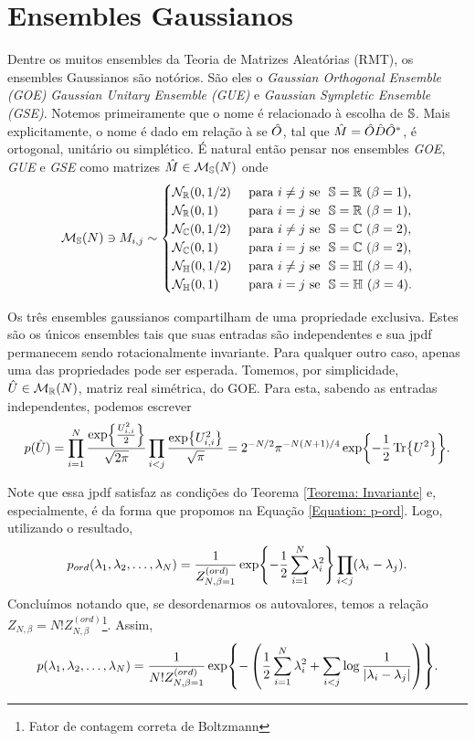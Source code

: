 \section{Ensembles Gaussianos}

Dentre os muitos ensembles da Teoria de Matrizes Aleatórias (RMT), os ensembles Gaussianos são notórios. São eles o \textit{Gaussian Orthogonal Ensemble (GOE)} \textit{Gaussian Unitary Ensemble (GUE)} e \textit{Gaussian Sympletic Ensemble (GSE)}. Notemos primeiramente que o nome é relacionado à escolha de $\mathbb{S}$. Mais explicitamente, o nome é dado em relação à se $\hat O$, tal que $\hat M = \hat O\hat D\hat O^*$, é ortogonal, unitário ou simplético. É natural então pensar nos ensembles \textit{GOE}, \textit{GUE} e \textit{GSE} como matrizes $\hat M \in \mathcal{M}_{\mathbb{S}}(N)$ onde 
$$ 
\mathcal{M}_{\Se}(N) \ni M_{i,j} \sim
\begin{cases}
	\mathcal{N}_{\R}(0,1/2) &  \ \text{para} \ i \neq j \ \text{se} \ \ \Se = \R \ (\beta = 1),\\
	\mathcal{N}_{\R}(0,1) & \ \text{para} \ i = j \ \text{se} \ \ \Se = \R \ (\beta = 1),\\
	\mathcal{N}_{\C}(0,1/2)  & \ \text{para} \ i \neq j \ \text{se} \ \ \Se = \C \ (\beta = 2),\\
	\mathcal{N}_{\C}(0,1) & \ \text{para} \ i = j \ \text{se} \ \ \Se = \C \ (\beta = 2),\\
	\mathcal{N}_{\He}(0,1/2) & \ \text{para} \ i \neq j \ \text{se} \ \ \Se = \He \ (\beta = 4), \\
	\mathcal{N}_{\He}(0,1) & \ \text{para} \ i = j \ \text{se} \ \ \Se = \He \ (\beta = 4).
\end{cases} $$


Os três ensembles gaussianos compartilham de uma propriedade exclusiva. Estes são os únicos ensembles tais que suas entradas são independentes e sua jpdf permanecem sendo rotacionalmente invariante. Para qualquer outro caso, apenas uma das propriedades pode ser esperada. Tomemos, por simplicidade, $\hat U \in \mathcal{M}_{\mathbb{R}}(N)$, matriz real simétrica, do GOE. Para esta, sabendo as entradas independentes, podemos escrever $$p(\hat U) = \prod_{i=1}^{N}\frac{\exp{\frac{U_{i,i}^2}{2}}}{\sqrt{2\pi}} \prod_{i<j} \frac{\exp{U_{i,i}^2}}{\sqrt{\pi}} = 2^{-N/2} \pi^{-N(N + 1)/4} \exp{-\frac{1}{2} \Tr{U^2}}.$$

Note que essa jpdf satisfaz as condições do Teorema \ref{Teorema: Invariante} e, especialmente, é da forma que propomos na Equação \ref{Equation: p-ord}. Logo, utilizando o resultado, $$ p_{ord}(\lambda_1, \lambda_2, \dots, \lambda_N) = \frac{1}{Z_{N, \beta = 1}^{(ord)}} \exp{-\frac{1}{2} \sum_{i = 1}^{N} \lambda_i^2} \prod_{i < j} (\lambda_i - \lambda_j).$$ Concluímos notando que, se desordenarmos os autovalores, temos a relação $ Z_{N, \beta} = N! Z_{N, \beta}^{(ord)}$\footnote{Fator de contagem correta de Boltzmann}. Assim, $$ p(\lambda_1, \lambda_2, \dots, \lambda_N) = \frac{1}{ N! Z_{N, \beta = 1}^{(ord)}} \exp{- \left(\frac{1}{2} \sum_{i = 1}^{N} \lambda_i^2 + \sum_{i < j} \log\frac{1}{|\lambda_i - \lambda_j|} \right)}.$$


